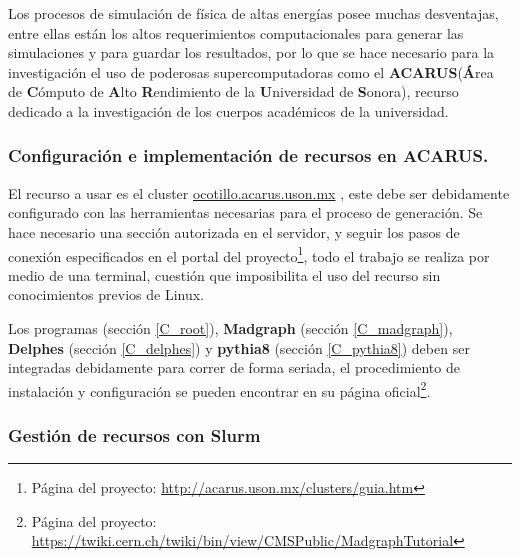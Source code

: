 Los procesos de simulación de física de altas energías posee muchas desventajas, entre ellas están los altos requerimientos computacionales para generar las simulaciones y para guardar los resultados, por lo que se hace necesario para la investigación el uso de poderosas supercomputadoras como el \textbf{ACARUS}(\textbf{Á}rea de \textbf{C}ómputo de \textbf{A}lto \textbf{R}endimiento de la \textbf{U}niversidad de \textbf{S}onora), recurso dedicado a la investigación de los cuerpos académicos de la universidad.

\subsubsection{Configuración e implementación de recursos en ACARUS.}
El recurso a usar es el cluster \href{ocotillo.acarus.uson.mx}{ocotillo.acarus.uson.mx} %
, este debe ser debidamente configurado con las herramientas necesarias para el proceso de generación. Se hace necesario una sección autorizada en el servidor, y seguir los pasos de conexión especificados en el portal del proyecto\footnote{ Página del proyecto: \href{http://acarus.uson.mx/clusters/guia.htm}{http://acarus.uson.mx/clusters/guia.htm}}, todo el trabajo se realiza por medio de una terminal, cuestión que imposibilita el uso del recurso sin conocimientos previos de Linux.

Los programas \ROOT (sec\-ción \ref{C_root}), \textbf{Madgraph} (sec\-ción \ref{C_madgraph}), \textbf{Del\-phes} (sec\-ción \-\ref{C_delphes}) y \textbf{py\-thia8} (sec\-ción \ref{C_pythia8}) de\-ben ser integradas debidamente para correr de forma seriada, el procedimiento de instalación y configuración se pueden encontrar en su página oficial\footnote{Página del proyecto: \href{https://twiki.cern.ch/twiki/bin/view/CMSPublic/MadgraphTutorial}{https://twiki.cern.ch/twiki/bin/view/CMSPublic/MadgraphTutorial}}. 

\subsubsection{Gestión de recursos con Slurm}

